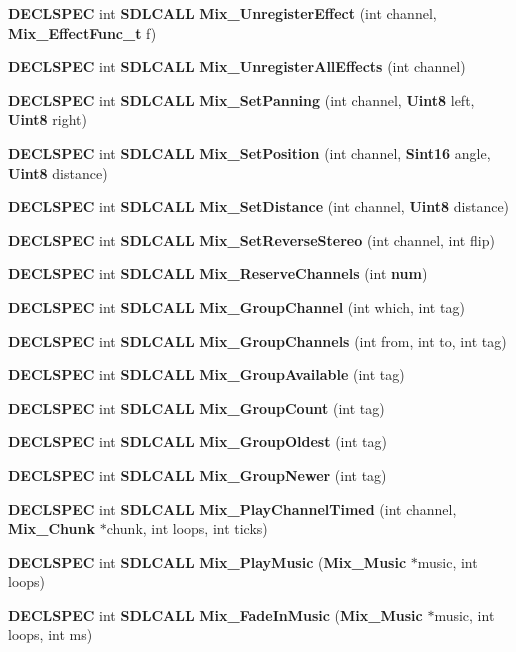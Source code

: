 \begin{DoxyCompactItemize}
{\bf D\+E\+C\+L\+S\+P\+E\+C} int {\bf S\+D\+L\+C\+A\+L\+L} {\bf Mix\+\_\+\+Unregister\+Effect} (int channel, {\bf Mix\+\_\+\+Effect\+Func\+\_\+t} f)
\item 
{\bf D\+E\+C\+L\+S\+P\+E\+C} int {\bf S\+D\+L\+C\+A\+L\+L} {\bf Mix\+\_\+\+Unregister\+All\+Effects} (int channel)
\item 
{\bf D\+E\+C\+L\+S\+P\+E\+C} int {\bf S\+D\+L\+C\+A\+L\+L} {\bf Mix\+\_\+\+Set\+Panning} (int channel, {\bf Uint8} left, {\bf Uint8} right)
\item 
{\bf D\+E\+C\+L\+S\+P\+E\+C} int {\bf S\+D\+L\+C\+A\+L\+L} {\bf Mix\+\_\+\+Set\+Position} (int channel, {\bf Sint16} angle, {\bf Uint8} distance)
\item 
{\bf D\+E\+C\+L\+S\+P\+E\+C} int {\bf S\+D\+L\+C\+A\+L\+L} {\bf Mix\+\_\+\+Set\+Distance} (int channel, {\bf Uint8} distance)
\item 
{\bf D\+E\+C\+L\+S\+P\+E\+C} int {\bf S\+D\+L\+C\+A\+L\+L} {\bf Mix\+\_\+\+Set\+Reverse\+Stereo} (int channel, int flip)
\item 
{\bf D\+E\+C\+L\+S\+P\+E\+C} int {\bf S\+D\+L\+C\+A\+L\+L} {\bf Mix\+\_\+\+Reserve\+Channels} (int {\bf num})
\item 
{\bf D\+E\+C\+L\+S\+P\+E\+C} int {\bf S\+D\+L\+C\+A\+L\+L} {\bf Mix\+\_\+\+Group\+Channel} (int which, int tag)
\item 
{\bf D\+E\+C\+L\+S\+P\+E\+C} int {\bf S\+D\+L\+C\+A\+L\+L} {\bf Mix\+\_\+\+Group\+Channels} (int from, int to, int tag)
\item 
{\bf D\+E\+C\+L\+S\+P\+E\+C} int {\bf S\+D\+L\+C\+A\+L\+L} {\bf Mix\+\_\+\+Group\+Available} (int tag)
\item 
{\bf D\+E\+C\+L\+S\+P\+E\+C} int {\bf S\+D\+L\+C\+A\+L\+L} {\bf Mix\+\_\+\+Group\+Count} (int tag)
\item 
{\bf D\+E\+C\+L\+S\+P\+E\+C} int {\bf S\+D\+L\+C\+A\+L\+L} {\bf Mix\+\_\+\+Group\+Oldest} (int tag)
\item 
{\bf D\+E\+C\+L\+S\+P\+E\+C} int {\bf S\+D\+L\+C\+A\+L\+L} {\bf Mix\+\_\+\+Group\+Newer} (int tag)
\item 
{\bf D\+E\+C\+L\+S\+P\+E\+C} int {\bf S\+D\+L\+C\+A\+L\+L} {\bf Mix\+\_\+\+Play\+Channel\+Timed} (int channel, {\bf Mix\+\_\+\+Chunk} $\ast$chunk, int loops, int ticks)
\item 
{\bf D\+E\+C\+L\+S\+P\+E\+C} int {\bf S\+D\+L\+C\+A\+L\+L} {\bf Mix\+\_\+\+Play\+Music} ({\bf Mix\+\_\+\+Music} $\ast$music, int loops)
\item 
{\bf D\+E\+C\+L\+S\+P\+E\+C} int {\bf S\+D\+L\+C\+A\+L\+L} {\bf Mix\+\_\+\+Fade\+In\+Music} ({\bf Mix\+\_\+\+Music} $\ast$music, int loops, int ms)

\end{DoxyCompactItemize}
